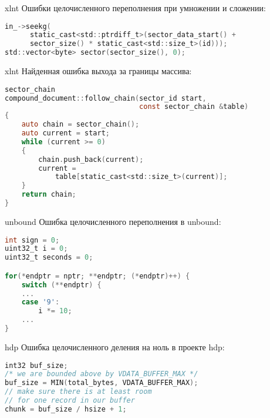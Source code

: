 \documentclass[10pt]{beamer}
\begin{document}
\begin{frame}[fragile]{xlnt}
Ошибки целочисленного переполнения при умножении и сложении:
\tiny
\begin{lstlisting}[language=C, basicstyle=\small\ttfamily,
                   xleftmargin=2em,
                   captionpos=b,
                   label=lst:xlnt-overflow]
in_->seekg(
      static_cast<std::ptrdiff_t>(sector_data_start() +
      sector_size() * static_cast<std::size_t>(id)));
std::vector<byte> sector(sector_size(), 0);
\end{lstlisting}
\end{frame}

\begin{frame}[fragile]{xlnt}
Найденная ошибка выхода за границы массива:
\begin{lstlisting}[language=C, basicstyle=\small\ttfamily,
                   xleftmargin=2em,
                   captionpos=b,
                   label=lst:xlnt-oob]
sector_chain
compound_document::follow_chain(sector_id start,
                                const sector_chain &table)
{
    auto chain = sector_chain();
    auto current = start;
    while (current >= 0)
    {
        chain.push_back(current);
        current =
            table[static_cast<std::size_t>(current)];
    }
    return chain;
}
\end{lstlisting}
\end{frame}

\begin{frame}[fragile]{unbound}
Ошибка целочисленного переполнения в unbound:
\begin{lstlisting}[language=C, basicstyle=\small\ttfamily,
                   xleftmargin=2em,
                   captionpos=b,
                   label=lst:unbound_overflow]
int sign = 0;
uint32_t i = 0;
uint32_t seconds = 0;

for(*endptr = nptr; **endptr; (*endptr)++) {
    switch (**endptr) {
    ...
    case '9':
        i *= 10;
    ...
}
\end{lstlisting}
\end{frame}

\begin{frame}[fragile]{hdp}
Ошибка целочисленного деления на ноль в проекте hdp:
\begin{lstlisting}[language=C, basicstyle=\small\ttfamily,
                   xleftmargin=2em,
                   captionpos=b,
                   label=lst:hdp-zerodiv]
int32 buf_size;
/* we are bounded above by VDATA_BUFFER_MAX */
buf_size = MIN(total_bytes, VDATA_BUFFER_MAX);
// make sure there is at least room
// for one record in our buffer
chunk = buf_size / hsize + 1;
\end{lstlisting}
\end{frame}
\end{document}
